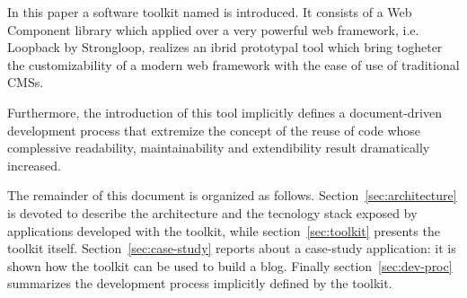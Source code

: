 In this paper a software toolkit named  is introduced. It consists of a Web Component library which applied over a very powerful web framework, i.e. Loopback by Strongloop, realizes an ibrid prototypal tool which bring togheter the customizability of a modern web framework with the ease of use of traditional CMSs.

Furthermore, the introduction of this tool implicitly defines a document-driven development process that extremize the concept of the reuse of code whose complessive readability, maintainability and extendibility result dramatically increased.


The remainder of this document is organized as follows. Section~\ref{sec:architecture} is devoted to describe the architecture and the tecnology stack exposed by applications developed with the toolkit, while section~\ref{sec:toolkit} presents the toolkit itself. Section~\ref{sec:case-study} reports about a case-study application: it is shown how the toolkit can be used to build a blog. Finally section~\ref{sec:dev-proc} summarizes the development process implicitly defined by the  toolkit.

